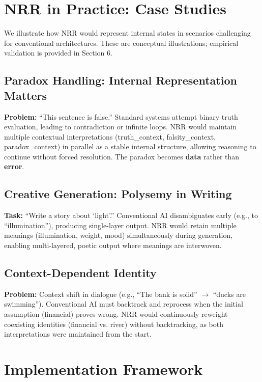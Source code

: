 \documentclass[11pt,a4paper]{article}
\begin{document}
\section{NRR in Practice: Case Studies}

We illustrate how NRR would represent internal states in scenarios challenging for conventional architectures. These are conceptual illustrations; empirical validation is provided in Section 6.

\subsection{Paradox Handling: Internal Representation Matters}

\textbf{Problem:} ``This sentence is false.''
Standard systems attempt binary truth evaluation, leading to contradiction or infinite loops.
NRR would maintain multiple contextual interpretations (truth\_context, falsity\_context, paradox\_context) in parallel as a stable internal structure, allowing reasoning to continue without forced resolution.
The paradox becomes \textbf{data} rather than \textbf{error}.

\subsection{Creative Generation: Polysemy in Writing}

\textbf{Task:} ``Write a story about `light'.''
Conventional AI disambiguates early (e.g., to ``illumination''), producing single-layer output.
NRR would retain multiple meanings (illumination, weight, mood) simultaneously during generation, enabling multi-layered, poetic output where meanings are interwoven.

\subsection{Context-Dependent Identity}

\textbf{Problem:} Context shift in dialogue (e.g., ``The bank is solid'' $\to$ ``ducks are swimming'').
Conventional AI must backtrack and reprocess when the initial assumption (financial) proves wrong.
NRR would continuously reweight coexisting identities (financial vs. river) without backtracking, as both interpretations were maintained from the start.

\section{Implementation Framework}
\label{sec:implementation}
\end{document}
